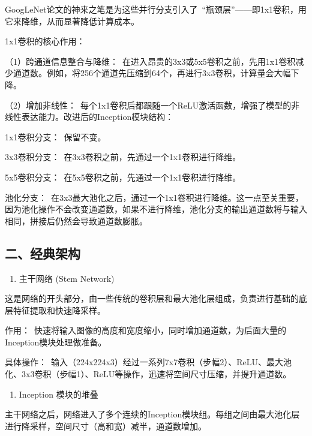 GoogLeNet论文的神来之笔是为这些并行分支引入了~``瓶颈层''------即1x1卷积，用它来降维，从而显著降低计算成本。

1x1卷积的核心作用：

（1）跨通道信息整合与降维：~在进入昂贵的3x3或5x5卷积之前，先用1x1卷积减少通道数。例如，将256个通道先压缩到64个，再进行3x3卷积，计算量会大幅下降。

（2）增加非线性：~每个1x1卷积后都跟随一个ReLU激活函数，增强了模型的非线性表达能力。改进后的Inception模块结构：

1x1卷积分支：~保留不变。

3x3卷积分支：~在3x3卷积之前，先通过一个1x1卷积进行降维。

5x5卷积分支：~在5x5卷积之前，先通过一个1x1卷积进行降维。

池化分支：~在3x3最大池化之后，通过一个1x1卷积进行降维。这一点至关重要，因为池化操作不会改变通道数，如果不进行降维，池化分支的输出通道数将与输入相同，拼接后仍然会导致通道数膨胀。

\hypertarget{ux4e8cux7ecfux5178ux67b6ux6784}{%
\subsection{二、经典架构}\label{ux4e8cux7ecfux5178ux67b6ux6784}}

\begin{enumerate}
\def\labelenumi{\arabic{enumi}.}
\tightlist
\item
  主干网络 (Stem Network)
\end{enumerate}

这是网络的开头部分，由一些传统的卷积层和最大池化层组成，负责进行基础的底层特征提取和快速降采样。

作用：~快速将输入图像的高度和宽度缩小，同时增加通道数，为后面大量的Inception模块处理做准备。

具体操作：~输入（224x224x3）经过一系列7x7卷积（步幅2）、ReLU、最大池化、3x3卷积（步幅1）、ReLU等操作，迅速将空间尺寸压缩，并提升通道数。

\begin{enumerate}
\def\labelenumi{\arabic{enumi}.}
\setcounter{enumi}{1}
\tightlist
\item
  Inception 模块的堆叠
\end{enumerate}

主干网络之后，网络进入了多个连续的Inception模块组。每组之间由最大池化层进行降采样，空间尺寸（高和宽）减半，通道数增加。

